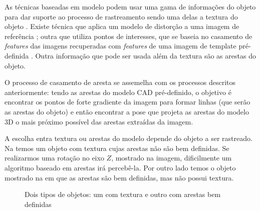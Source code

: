 As técnicas baseadas em modelo podem usar uma gama de informações do objeto para dar suporte ao processo de rastreamento sendo uma delas a textura do objeto \cite{teichrieb2007survey}. Existe técnica que aplica um modelo de distorção a uma imagem de referência \cite{ref_19tgchico}; outra que utiliza pontos de interesses, que se baseia no casamento de \emph{features} das imagens recuperadas com \emph{features} de uma imagem de template pré-definida \cite{lepetit}. Outra informação que pode ser usada além da textura são as arestas do objeto.

O processo de casamento de aresta se assemelha com os processos descritos anteriormente: tendo as arestas do modelo CAD pré-definido, o objetivo é encontrar os pontos de forte gradiente da imagem para formar linhas (que serão as arestas do objeto) e então encontrar a pose que projeta as arestas do modelo 3D o mais próximo possível das arestas extraídas da imagem.

A escolha entra textura ou arestas do modelo depende do objeto a ser rastreado. Na  temos um objeto com textura cujas arestas não são bem definidas. Se realizarmos uma rotação no eixo $Z$, mostrado na imagem, dificilmente um algoritmo baseado em arestas irá percebê-la. Por outro lado temos o objeto mostrado na  em que as arestas são bem definidas, mas não possui textura.

\begin{figure}[!ht]
	\centerline{
		\hfil
	}
	\caption{Dois tipos de objetos: um com textura e outro com arestas bem definidas}
\end{figure}

